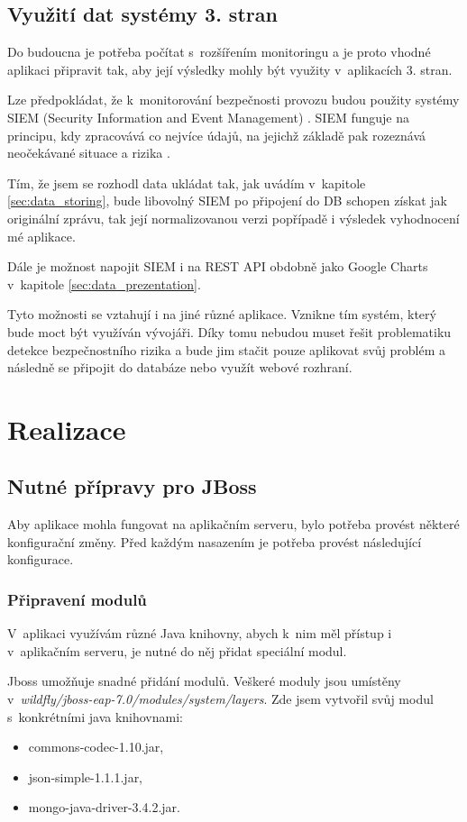 \documentclass[thesis=M,czech]{FITthesis}[2012/10/20]
\begin{document}
	\section{Využití dat systémy 3. stran}
		Do budoucna je potřeba počítat s~rozšířením monitoringu a je proto vhodné aplikaci připravit tak, aby její výsledky mohly být využity v~aplikacích 3. stran.
		
		Lze předpokládat, že k~monitorování bezpečnosti provozu budou použity systémy SIEM (Security Information and Event Management) \cite{siem}.
		SIEM funguje na principu, kdy zpracovává co nejvíce údajů, na jejichž základě pak rozeznává neočekávané situace a rizika \cite{howDesSiemWork}.
		
		Tím, že jsem se rozhodl data ukládat tak, jak uvádím v~kapitole \ref{sec:data_storing}, bude libovolný SIEM po připojení do DB schopen získat jak originální zprávu, tak její normalizovanou verzi popřípadě i výsledek vyhodnocení mé aplikace.
		
		Dále je možnost napojit SIEM i na REST API obdobně jako Google Charts v~kapitole \ref{sec:data_prezentation}.
		
		Tyto možnosti se vztahují i na jiné různé aplikace. Vznikne tím systém, který bude moct být využíván vývojáři. Díky tomu nebudou muset řešit problematiku detekce bezpečnostního rizika a bude jim stačit pouze aplikovat svůj problém a následně se připojit do databáze nebo využít webové rozhraní. 
		
\chapter{Realizace}
	
	\section{Nutné přípravy pro JBoss}
		Aby aplikace mohla fungovat na aplikačním serveru, bylo potřeba provést některé konfigurační změny. Před každým nasazením je potřeba provést následující konfigurace.
		
		\subsection{Připravení modulů}
		V~aplikaci využívám různé Java knihovny, abych k~nim měl přístup i v~aplikačním serveru, je nutné do něj přidat speciální modul.
		
		Jboss umožňuje snadné přidání modulů. Veškeré moduly jsou umístěny v~\textit{wildfly/jboss-eap-7.0/modules/system/layers}. Zde jsem vytvořil svůj modul s~konkrétními java knihovnami:
		\begin{itemize} 
			\item commons-codec-1.10.jar,
			\item json-simple-1.1.1.jar,
			\item mongo-java-driver-3.4.2.jar.		
		\end{itemize}
	
\end{document}
